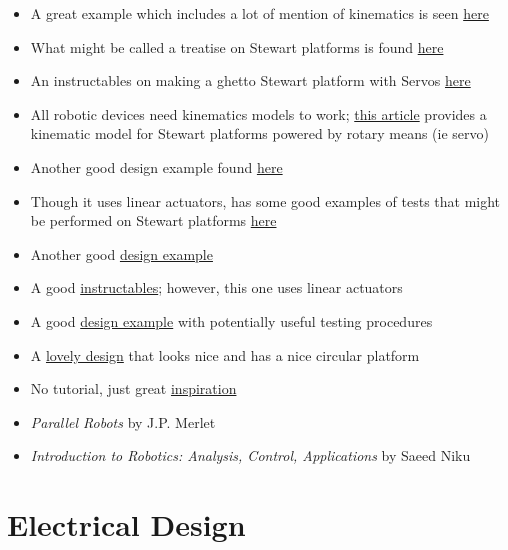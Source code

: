 \documentclass[a4paper, 10pt]{article}
\begin{document}
	\begin{itemize}
		\item A great example which includes a lot of mention of kinematics is seen \href{https://ntrs.nasa.gov/api/citations/19910007810/downloads/19910007810.pdf}{here}
		\item What might be called a treatise on Stewart platforms is found \href{https://www.ri.cmu.edu/pub_files/pub4/fong_terrence_w_1990_1/fong_terrence_w_1990_1.pdf}{here}
		\item An instructables on making a ghetto Stewart platform with Servos \href{https://www.instructables.com/Stewart-Platform/}{here}
		\item All robotic devices need kinematics models to work; \href{https://www.xarg.org/paper/inverse-kinematics-of-a-stewart-platform/}{this article} provides a kinematic model for Stewart platforms powered by rotary means (ie servo)
		\item Another good design example found \href{https://iopscience.iop.org/article/10.1088/1757-899X/563/5/052059/pdf}{here}
		\item Though it uses linear actuators, has some good examples of tests that might be performed on Stewart platforms \href{https://www.ncbi.nlm.nih.gov/pmc/articles/PMC6513003/}{here}
		\item Another good \href{https://core.ac.uk/download/pdf/322824733.pdf}{design example}
		\item A good \href{https://www.instructables.com/Six-Axis-Platform-Using-Linear-Actuators-Stewart-P/}{instructables}; however, this one uses linear actuators
		\item A good \href{https://www.ohio.edu/mechanical-faculty/williams/html/PDF/IndRob02.pdf}{design example} with potentially useful testing procedures
		\item A \href{https://www.mdpi.com/2218-6581/7/2/30}{lovely design} that looks nice and has a nice circular platform
		\item No tutorial, just great \href{https://www.youtube.com/watch?v=kscvCQTtVvw&t=0s}{inspiration}
		\item \textit{Parallel Robots} by J.P. Merlet
		\item \textit{Introduction to Robotics: Analysis, Control, Applications} by Saeed Niku
	\end{itemize}
	
	
\newpage	
	
\section{Electrical Design}
\end{document}
